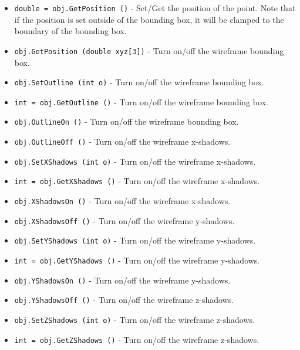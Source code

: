 \begin{itemize}
\item  \verb|double = obj.GetPosition ()| -  Set/Get the position of the point. Note that if the position is set
 outside of the bounding box, it will be clamped to the boundary of
 the bounding box.

\item  \verb|obj.GetPosition (double xyz[3])| -  Turn on/off the wireframe bounding box.

\item  \verb|obj.SetOutline (int o)| -  Turn on/off the wireframe bounding box.

\item  \verb|int = obj.GetOutline ()| -  Turn on/off the wireframe bounding box.

\item  \verb|obj.OutlineOn ()| -  Turn on/off the wireframe bounding box.

\item  \verb|obj.OutlineOff ()| -  Turn on/off the wireframe x-shadows.

\item  \verb|obj.SetXShadows (int o)| -  Turn on/off the wireframe x-shadows.

\item  \verb|int = obj.GetXShadows ()| -  Turn on/off the wireframe x-shadows.

\item  \verb|obj.XShadowsOn ()| -  Turn on/off the wireframe x-shadows.

\item  \verb|obj.XShadowsOff ()| -  Turn on/off the wireframe y-shadows.

\item  \verb|obj.SetYShadows (int o)| -  Turn on/off the wireframe y-shadows.

\item  \verb|int = obj.GetYShadows ()| -  Turn on/off the wireframe y-shadows.

\item  \verb|obj.YShadowsOn ()| -  Turn on/off the wireframe y-shadows.

\item  \verb|obj.YShadowsOff ()| -  Turn on/off the wireframe z-shadows.

\item  \verb|obj.SetZShadows (int o)| -  Turn on/off the wireframe z-shadows.

\item  \verb|int = obj.GetZShadows ()| -  Turn on/off the wireframe z-shadows.


\end{itemize}
